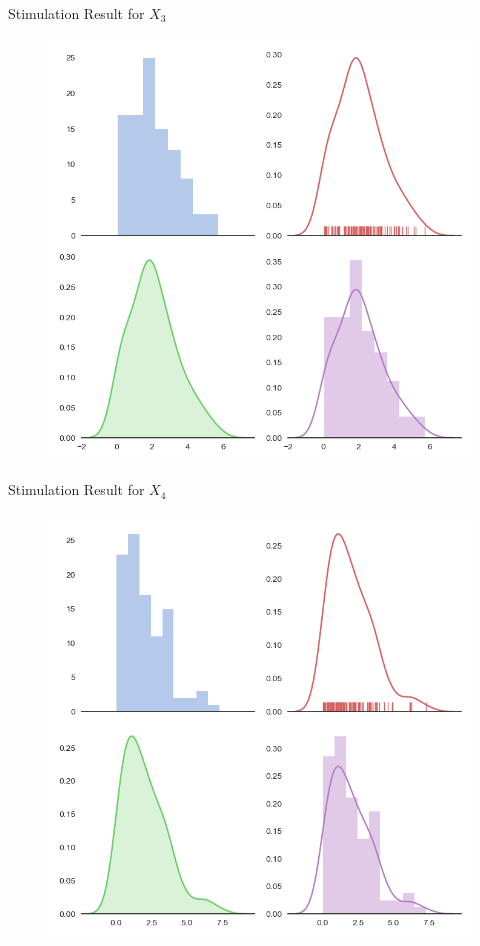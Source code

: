 \documentclass[12pt]{beamer}
\begin{document}
\begin{frame}{Stimulation Result for \(X_3\)}
	\begin{figure}[!ht]
		\centering
		\includegraphics[width=0.7\columnwidth,height=0.6\linewidth]{fig/output_3.png}
	\end{figure}
\end{frame}

\begin{frame}{Stimulation Result for \(X_4\)}
	\begin{figure}[!ht]
		\centering
		\includegraphics[width=0.7\columnwidth,height=0.6\linewidth]{fig/output_4.png}
	\end{figure}
\end{frame}
\end{document}
